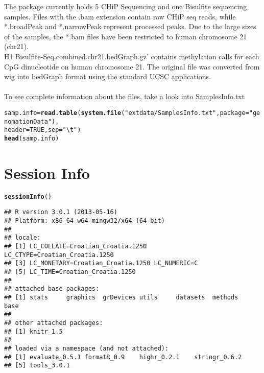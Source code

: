 \documentclass[12pt]{article}\usepackage[]{graphicx}\usepackage[]{color}
\makeatletter
\newcommand{\hlnum}[1]{\textcolor[rgb]{0.686,0.059,0.569}{#1}}%
\newcommand{\hlstr}[1]{\textcolor[rgb]{0.192,0.494,0.8}{#1}}%
\newcommand{\hlstd}[1]{\textcolor[rgb]{0.345,0.345,0.345}{#1}}%
\newcommand{\hlkwb}[1]{\textcolor[rgb]{0.69,0.353,0.396}{#1}}%
\newcommand{\hlkwc}[1]{\textcolor[rgb]{0.333,0.667,0.333}{#1}}%
\newcommand{\hlkwd}[1]{\textcolor[rgb]{0.737,0.353,0.396}{\textbf{#1}}}%
\newenvironment{kframe}{%
 \def\at@end@of@kframe{}%
 \ifinner\ifhmode%
  \def\at@end@of@kframe{\end{minipage}}%
  \begin{minipage}{\columnwidth}%
 \fi\fi%
 \def\FrameCommand##1{\hskip\@totalleftmargin \hskip-\fboxsep
 \colorbox{shadecolor}{##1}\hskip-\fboxsep
     \hskip-\linewidth \hskip-\@totalleftmargin \hskip\columnwidth}%
 \MakeFramed {\advance\hsize-\width
   \@totalleftmargin\z@ \linewidth\hsize
   \@setminipage}}%
 {\par\unskip\endMakeFramed%
 \at@end@of@kframe}
\newenvironment{knitrout}{}{} %
\makeatother
\begin{document}
The package currently holds 5 CHiP Sequencing and one Bisulfite sequencing samples. 
Files with the .bam extension contain raw CHiP seq reads, while *.broadPeak and *.narrowPeak represent processed peaks. 
Due to the large sizes of the samples, the *.bam files have been restricted to human chromosome 21 (chr21).
\\
H1.Bisulfite-Seq.combined.chr21.bedGraph.gz' contains methylation calls for each CpG dinucleotide on human chromosome 21. 
The original file was converted from wig into bedGraph format using the standard UCSC applications.
\\
\\
To see complete information about the files, take a look into SamplesInfo.txt
\begin{knitrout}
\color{fgcolor}\begin{kframe}
\begin{alltt}
\hlstd{samp.info} \hlkwb{=} \hlkwd{read.table}\hlstd{(}\hlkwd{system.file}\hlstd{(}\hlstr{"extdata/SamplesInfo.txt"}\hlstd{,} \hlkwc{package} \hlstd{=} \hlstr{"genomationData"}\hlstd{),}
    \hlkwc{header} \hlstd{=} \hlnum{TRUE}\hlstd{,} \hlkwc{sep} \hlstd{=} \hlstr{"\textbackslash{}t"}\hlstd{)}
\hlkwd{head}\hlstd{(samp.info)}
\end{alltt}
\end{kframe}
\end{knitrout}


\section{Session Info}
\begin{knitrout}
\color{fgcolor}\begin{kframe}
\begin{alltt}
\hlkwd{sessionInfo}\hlstd{()}
\end{alltt}
\begin{verbatim}
## R version 3.0.1 (2013-05-16)
## Platform: x86_64-w64-mingw32/x64 (64-bit)
## 
## locale:
## [1] LC_COLLATE=Croatian_Croatia.1250  LC_CTYPE=Croatian_Croatia.1250   
## [3] LC_MONETARY=Croatian_Croatia.1250 LC_NUMERIC=C                     
## [5] LC_TIME=Croatian_Croatia.1250    
## 
## attached base packages:
## [1] stats     graphics  grDevices utils     datasets  methods   base     
## 
## other attached packages:
## [1] knitr_1.5
## 
## loaded via a namespace (and not attached):
## [1] evaluate_0.5.1 formatR_0.9    highr_0.2.1    stringr_0.6.2 
## [5] tools_3.0.1
\end{verbatim}
\end{kframe}
\end{knitrout}




\end{document}
